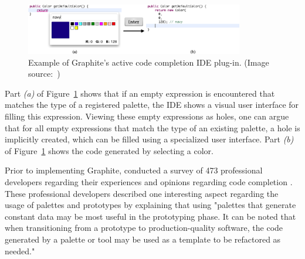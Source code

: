 \begin{figure}[ht]
    \centering
    \includegraphics[width=0.85\textwidth]{images/active-code-completion}
    \caption{Example of Graphite's active code completion IDE plug-in. (Image source:~\cite{omar_active_2012})}
    \label{fig:graphite-active-code-completion}
\end{figure}

Part \emph{(a)} of Figure~\ref{fig:graphite-active-code-completion} shows that if an empty expression is encountered that matches the type of a registered palette, the IDE shows a visual user interface for filling this expression.
Viewing these empty expressions as holes, one can argue that for all empty expressions that match the type of an existing palette, a hole is implicitly created, which can be filled using a specialized user interface.
Part \emph{(b)} of Figure~\ref{fig:graphite-active-code-completion} shows the code generated by selecting a color.

Prior to implementing Graphite, \citeauthor{omar_active_2012} conducted a survey of 473 professional developers regarding their experiences and opinions regarding code completion \cite{omar_active_2012}.
These professional developers described one interesting aspect regarding the usage of palettes and prototypes by explaining that using "palettes that generate constant data may be most useful in the prototyping phase. It can be noted that when transitioning from a prototype to production-quality software, the code generated by a palette or tool may be used as a template to be refactored as needed." \cite{omar_active_2012}

